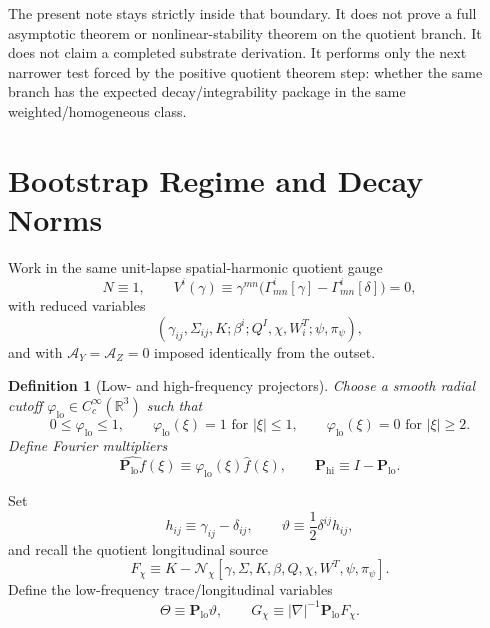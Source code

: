 \documentclass[11pt]{article}
\newcommand{\AY}{\mathcal A_Y}
\newcommand{\AZ}{\mathcal A_Z}
\newtheorem{definition}{Definition}
\begin{document}
The present note stays strictly inside that boundary. It does not prove a full asymptotic theorem or nonlinear-stability theorem on the quotient branch. It does not claim a completed substrate derivation. It performs only the next narrower test forced by the positive quotient theorem step: whether the same branch has the expected decay/integrability package in the same weighted/homogeneous class.

\section{Bootstrap Regime and Decay Norms}

Work in the same unit-lapse spatial-harmonic quotient gauge
\begin{equation}
N\equiv 1,
\qquad
V^i(\gamma)\equiv \gamma^{mn}\bigl(\Gamma^i_{mn}[\gamma]-\Gamma^i_{mn}[\delta]\bigr)=0,
\label{eq:gauge}
\end{equation}
with reduced variables
\begin{equation}
(\gamma_{ij},\Sigma_{ij},K;\beta^i;Q^I,\chi,W_i^T;\psi,\pi_\psi),
\label{eq:unknowns}
\end{equation}
and with \(\AY=\AZ=0\) imposed identically from the outset.

\begin{definition}[Low- and high-frequency projectors]
\label{def:projectors}
Choose a smooth radial cutoff \(\varphi_{\mathrm{lo}}\in C_c^\infty(\mathbb R^3)\) such that
\[
0\le \varphi_{\mathrm{lo}}\le 1,
\qquad
\varphi_{\mathrm{lo}}(\xi)=1 \text{ for } |\xi|\le 1,
\qquad
\varphi_{\mathrm{lo}}(\xi)=0 \text{ for } |\xi|\ge 2.
\]
Define Fourier multipliers
\begin{equation}
\widehat{\mathbf P_{\mathrm{lo}}f}(\xi)
\equiv
\varphi_{\mathrm{lo}}(\xi)\widehat f(\xi),
\qquad
\mathbf P_{\mathrm{hi}}\equiv I-\mathbf P_{\mathrm{lo}}.
\label{eq:projectors}
\end{equation}
\end{definition}

Set
\begin{equation}
h_{ij}\equiv \gamma_{ij}-\delta_{ij},
\qquad
\vartheta \equiv \frac12\delta^{ij}h_{ij},
\label{eq:basicdefs}
\end{equation}
and recall the quotient longitudinal source
\begin{equation}
F_\chi
\equiv
K-\mathcal N_\chi[\gamma,\Sigma,K,\beta,Q,\chi,W^T,\psi,\pi_\psi].
\label{eq:Fchi}
\end{equation}
Define the low-frequency trace/longitudinal variables
\begin{equation}
\Theta \equiv \mathbf P_{\mathrm{lo}}\vartheta,
\qquad
G_\chi \equiv |\nabla|^{-1}\mathbf P_{\mathrm{lo}}F_\chi.
\label{eq:ThetaG}
\end{equation}
\end{document}
